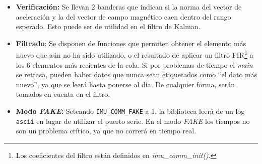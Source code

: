 \documentclass[main]{subfiles}
\begin{document}
\begin{itemize}
\begin{itemize}
\begin{itemize}
  \item $K_{inv}$ es la inversa de la matriz de ganancias.
  \item $b$ Es un offset.
  \end{itemize}
\item Aceler\'ometro: Adem\'as de una calibraci\'on como la del magnet\'ometro, se implement\'o una compensaci\'on por temperatura:
  \begin{equation}
    \label{eq:software:acc}
    conv = T*inv(K)*(crudo - b + b_t*(t - t_0))    
  \end{equation}
  donde
  \begin{itemize}
  \item $T$, $K$ y $b$ cumplen el mismo rol que en el magnet\'ometro.
  \item $t$ es la temperatura actual, y $t_0$ la temperatura a la que se realiz\'o  la calibraci\'on de donde surgieron $T$, $K$ y $b$.
  \item $b_t$ es el factor que permite la compensaci\'on por temperatura.
  \end{itemize}
\item Gir\'oscopo: Se implement\'o algo an\'alogo a lo que se hizo para el acceler\'ometro, solo que al final se le resta un offset que se determina durante la calibraci\'on al inicio del programa. Esto es sencillo de estimar, ya que basta con que el cuadric\'optero no se mueva durante la calibraci\'on.\newline
Implementar algo an\'alogo pero para el caso del acceler\'ometro o del magnet\'ometro ser\'ia m\'as complicado, ya que requerir\'ia que el cuadric\'optero estuviese perfectamente horizontal o orientado hacia el norte, respectivamente.
\end{itemize}

\item \textbf{Verificaci\'on:} Se llevan 2 banderas que indican si la norma del vector de aceleraci\'on y la del vector de campo magn\'etico caen dentro del rango esperado. Esto puede ser de utilidad en el filtro de Kalman.

\item \textbf{Filtrado}: Se disponen de funciones que permiten obtener el elemento m\'as nuevo que a\'un no ha sido utilizado, o el resultado de aplicar un filtro FIR\footnote{Los coeficientes del filtro est\'an definidos en \textit{imu\_comm\_init()}.} a los 6 elementos m\'as recientes de la cola. Si por problemas de tiempo el \textit{main} se retrasa, pueden haber datos que nunca sean etiquetados como ``el dato m\'as nuevo'', ya que se leer\'a hasta ponerse al dia. De cualquier forma, ser\'an tomados en cuenta en el filtro.

\item \textbf{Modo \textit{FAKE}:} Seteando \verb+IMU_COMM_FAKE+ a 1, la biblioteca leerá de un log \verb+ascii+ en lugar de utilizar el puerto serie. En el modo \textit{FAKE} los tiempos no son un problema cr\'itico, ya que no correr\'a en tiempo real.
\end{itemize}
\end{document}
